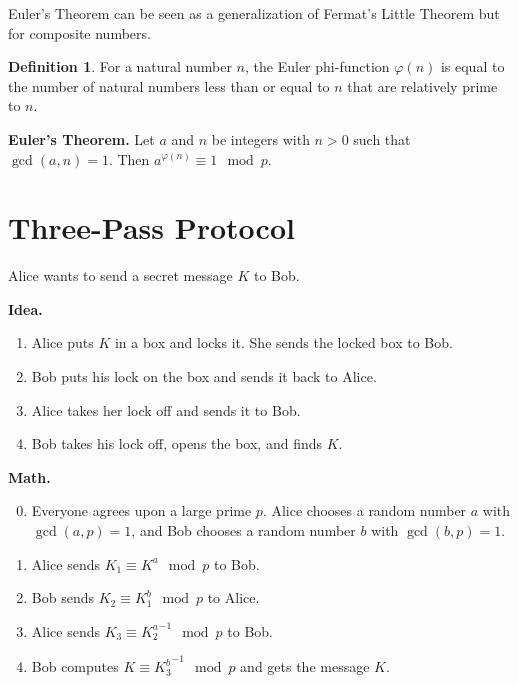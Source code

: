\documentclass[12pt]{amsart}
\theoremstyle{plain}
\theoremstyle{definition}
\newtheorem*{defn}{Definition}
\theoremstyle{remark}
\begin{document}
Euler's Theorem can be seen as a generalization of Fermat's Little Theorem but for composite numbers.

\begin{defn} For a natural number $n$, the Euler phi-function $\varphi(n)$ is equal to the number of natural numbers less than or equal to $n$ that are relatively prime to $n$.
\end{defn}

\vspace{1in}

\noindent\textbf{Euler's Theorem.} Let $a$ and $n$ be integers with $n > 0$ such that $\gcd(a,n) = 1$. Then $a^{\varphi(n)} \equiv 1 \mod p$.

\newpage
\section{Three-Pass Protocol}
Alice wants to send a secret message $K$ to Bob.

\noindent \textbf{Idea.}
\begin{enumerate}[1.]
	\item Alice puts $K$ in a box and locks it.  She sends the locked box to Bob.
	\item Bob puts his lock on the box and sends it back to Alice.
	\item Alice takes her lock off and sends it to Bob.
	\item Bob takes his lock off, opens the box, and finds $K$.
\end{enumerate}

\noindent \textbf{Math.}
\begin{enumerate}[1.]
	\setcounter{enumi}{-1}
	\item Everyone agrees upon a large prime $p$.  Alice chooses a random number $a$ with $\gcd(a,p) = 1$, and Bob chooses a random number $b$ with $\gcd(b,p) = 1$.
	\item Alice sends $K_1 \equiv K^a \mod p$ to Bob.
	\item Bob sends $K_2 \equiv K_1^b \mod p$ to Alice.
	\item Alice sends $K_3 \equiv {K_2^a}^{-1} \mod p$ to Bob.
	\item Bob computes $K \equiv {K_3^b}^{-1} \mod p$ and gets the message $K$.
\end{enumerate}
\end{document}
